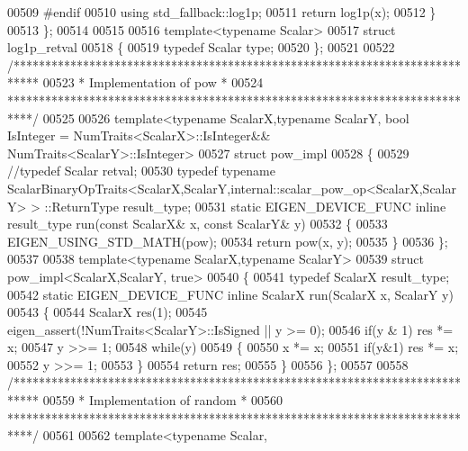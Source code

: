 \begin{DoxyCode}
00509 \textcolor{preprocessor}{    #endif}
00510     \textcolor{keyword}{using} std\_fallback::log1p;
00511     \textcolor{keywordflow}{return} log1p(x);
00512   \}
00513 \};
00514 
00515 
00516 \textcolor{keyword}{template}<\textcolor{keyword}{typename} Scalar>
00517 \textcolor{keyword}{struct }log1p\_retval
00518 \{
00519   \textcolor{keyword}{typedef} Scalar type;
00520 \};
00521 
00522 \textcolor{comment}{/****************************************************************************}
00523 \textcolor{comment}{* Implementation of pow                                                  *}
00524 \textcolor{comment}{****************************************************************************/}
00525 
00526 template<typename ScalarX,typename ScalarY, bool IsInteger = NumTraits<ScalarX>::IsInteger&&
      NumTraits<ScalarY>::IsInteger>
00527 \textcolor{keyword}{struct }pow\_impl
00528 \{
00529   \textcolor{comment}{//typedef Scalar retval;}
00530   \textcolor{keyword}{typedef} \textcolor{keyword}{typename} ScalarBinaryOpTraits<ScalarX,ScalarY,internal::scalar\_pow\_op<ScalarX,ScalarY> >
      ::ReturnType result\_type;
00531   \textcolor{keyword}{static} EIGEN\_DEVICE\_FUNC \textcolor{keyword}{inline} result\_type run(\textcolor{keyword}{const} ScalarX& x, \textcolor{keyword}{const} ScalarY& y)
00532   \{
00533     EIGEN\_USING\_STD\_MATH(pow);
00534     \textcolor{keywordflow}{return} pow(x, y);
00535   \}
00536 \};
00537 
00538 \textcolor{keyword}{template}<\textcolor{keyword}{typename} ScalarX,\textcolor{keyword}{typename} ScalarY>
00539 \textcolor{keyword}{struct }pow\_impl<ScalarX,ScalarY, true>
00540 \{
00541   \textcolor{keyword}{typedef} ScalarX result\_type;
00542   \textcolor{keyword}{static} EIGEN\_DEVICE\_FUNC \textcolor{keyword}{inline} ScalarX run(ScalarX x, ScalarY y)
00543   \{
00544     ScalarX res(1);
00545     eigen\_assert(!NumTraits<ScalarY>::IsSigned || y >= 0);
00546     \textcolor{keywordflow}{if}(y & 1) res *= x;
00547     y >>= 1;
00548     \textcolor{keywordflow}{while}(y)
00549     \{
00550       x *= x;
00551       \textcolor{keywordflow}{if}(y&1) res *= x;
00552       y >>= 1;
00553     \}
00554     \textcolor{keywordflow}{return} res;
00555   \}
00556 \};
00557 
00558 \textcolor{comment}{/****************************************************************************}
00559 \textcolor{comment}{* Implementation of random                                               *}
00560 \textcolor{comment}{****************************************************************************/}
00561 
00562 \textcolor{keyword}{template}<\textcolor{keyword}{typename} Scalar,

\end{DoxyCode}
